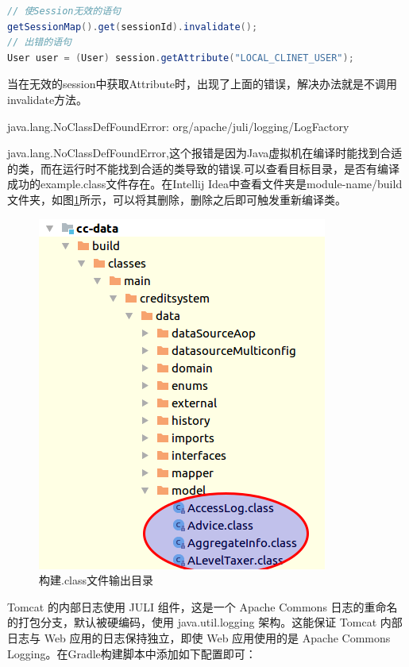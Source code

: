\documentclass[12pt]{book}
\makeatletter
\numberwithin{dummy}{section}
\theoremstyle{ocrenumbox}
\theoremstyle{blacknumex}
\theoremstyle{blacknumbox}
\theoremstyle{ocrenum}
\renewcommand\paragraph{\@startsection{paragraph}{4}{\z@}
	{-2ex \@plus-.2ex \@minus .2ex}
	{.1ex}
	{\normalfont\small\sffamily\bfseries}}
\makeatother
\begin{document}
\begin{lstlisting}[language=Java]
// 使Session无效的语句
getSessionMap().get(sessionId).invalidate();
// 出错的语句
User user = (User) session.getAttribute("LOCAL_CLINET_USER");
\end{lstlisting}

当在无效的session中获取Attribute时，出现了上面的错误，解决办法就是不调用invalidate方法。

\paragraph{java.lang.NoClassDefFoundError: org/apache/juli/logging/LogFactory}

java.lang.NoClassDefFoundError,这个报错是因为Java虚拟机在编译时能找到合适的类，而在运行时不能找到合适的类导致的错误.可以查看目标目录，是否有编译成功的example.class文件存在。在Intellij Idea中查看文件夹是module-name/build文件夹，如图\ref{fig:buildclassoutpath}所示，可以将其删除，删除之后即可触发重新编译类。

\begin{figure}[htbp]
	\centering
	\includegraphics[scale=0.5]{buildclassoutpath.png}
	\caption{构建.class文件输出目录}
	\label{fig:buildclassoutpath}
\end{figure}


Tomcat 的内部日志使用 JULI 组件，这是一个 Apache Commons 日志的重命名的打包分支，默认被硬编码，使用 java.util.logging 架构。这能保证 Tomcat 内部日志与 Web 应用的日志保持独立，即使 Web 应用使用的是 Apache Commons Logging。在Gradle构建脚本中添加如下配置即可：
\end{document}
